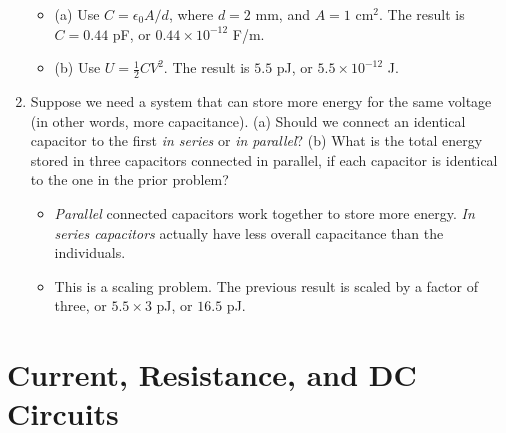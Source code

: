 \documentclass[10pt]{article}
\begin{document}
\begin{enumerate}
\begin{itemize}
\item (a) Use $C = \epsilon_0 A/d$, where $d = 2$ mm, and $A = 1$ cm$^2$.  The result is $C = 0.44$ pF, or $0.44 \times 10^{-12}$ F/m.
\item (b) Use $U = \frac{1}{2} C V^2$.  The result is $5.5$ pJ, or $5.5 \times 10^{-12}$ J.
\end{itemize}
\item Suppose we need a system that can store more energy for the same voltage (in other words, more capacitance).  (a) Should we connect an identical capacitor to the first \textit{in series} or \textit{in parallel}?  (b) What is the total energy stored in three capacitors connected in parallel, if each capacitor is identical to the one in the prior problem? \\
\begin{itemize}
\item \textit{Parallel} connected capacitors work together to store more energy.  \textit{In series capacitors} actually have less overall capacitance than the individuals.
\item This is a scaling problem.  The previous result is scaled by a factor of three, or $5.5 \times 3$ pJ, or $16.5$ pJ.
\end{itemize}
\end{enumerate}

\section{Current, Resistance, and DC Circuits}
\end{document}
